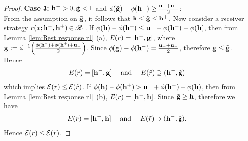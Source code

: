 \begin{proof}
\textbf{Case 3: }{$\mathbf{h^{-}} > 0, \tilde{\mathbf{g}} < 1$ and $\phi(\tilde{\mathbf{g}}) - \phi(\mathbf{h^{-}}) \geq \frac{\mathbf{u_+} + \mathbf{u_-}}{2}$:}\\
From the assumption on $\tilde{\mathbf{g}}$, it follows that $\mathbf{h} \leq \tilde{\mathbf{g}} \leq \mathbf{h^{+}}$. Now consider a receiver strategy $r(x;\mathbf{h^{-}},\mathbf{h^{+}}) \in \mathscr{R}_1$. If $\phi(\mathbf{h}) - \phi(\mathbf{h^{+}}) \leq \mathbf{u_-} + \phi(\mathbf{h^{-}}) - \phi(\mathbf{h})$, then from Lemma \ref{lem:Best response r1} (a), $E(r) = [\mathbf{h^{-}},\mathbf{g}]$, where
$\mathbf{g} := \phi^{-1}\Big(\frac{\phi(\mathbf{h^{-}}) + \phi(\mathbf{h^{+}}) + \mathbf{u_-}}{2}\Big)$.
Since $\phi(\mathbf{g}) - \phi(\mathbf{h^{-}}) =\frac{\mathbf{u_+}+\mathbf{u_-}}{2}$, therefore $\mathbf{g} \leq \tilde{\mathbf{g}}$.
Hence
$$E(r) = [\ib,\lb] \text{ and } E(\rt) \supseteq (\ib,\tlb)$$ which implies $\mathcal{E}(r) \leq \mathcal{E}(\tilde{r})$.
If $\phi(\mathbf{h}) - \phi(\mathbf{h^{+}}) > \mathbf{u_-} + \phi(\mathbf{h^{-}}) - \phi(\mathbf{h})$, then from Lemma \ref{lem:Best response r1} (b), $E(r) = [\mathbf{h^{-}},\mathbf{h}]$. Since $\tilde{\mathbf{g}} \geq \mathbf{h}$, therefore we have
\[E(r) = [\ib,\h] \text{ and } E(\rt) \supset (\ib,\tlb).\]
Hence $\mathcal{E}(r) \leq \mathcal{E}(\tilde{r})$.



\end{proof}
